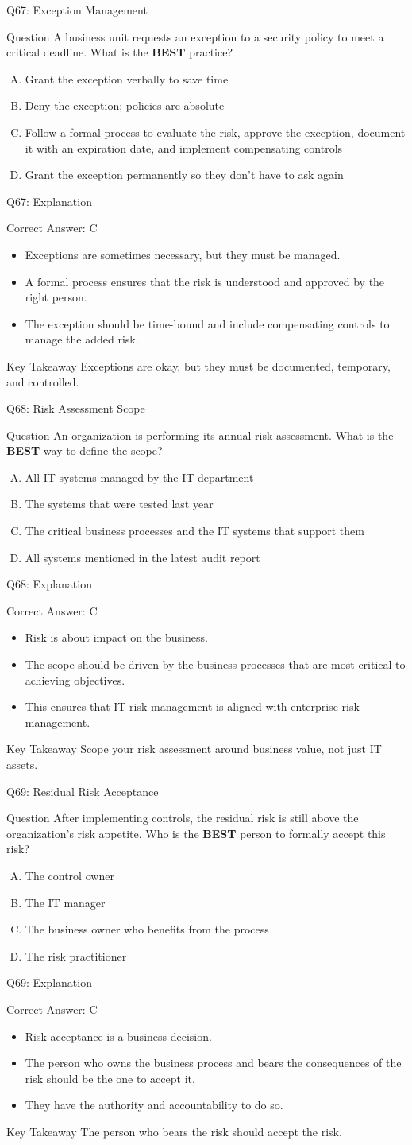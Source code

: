 \documentclass[aspectratio=169]{beamer}
\newcommand{\hq}[7]{%
	\begin{frame}{Q#1: #2}
		\begin{block}{Question}
			#3
		\end{block}
		\begin{enumerate}[(A)]
			#4
		\end{enumerate}
	\end{frame}
	\begin{frame}{Q#1: Explanation}
		\begin{block}{Correct Answer: #5}
			\begin{itemize}
				#6
			\end{itemize}
		\end{block}
		\begin{alertblock}{Key Takeaway}
			#7
		\end{alertblock}
	\end{frame}
}
\begin{document}
{		\hq{67}{Exception Management}
		{A business unit requests an exception to a security policy to meet a critical deadline. What is the \textbf{BEST} practice?}
		{\item Grant the exception verbally to save time
			\item Deny the exception; policies are absolute
			\item Follow a formal process to evaluate the risk, approve the exception, document it with an expiration date, and implement compensating controls
			\item Grant the exception permanently so they don't have to ask again}
		{C}
		{\item Exceptions are sometimes necessary, but they must be managed.
			\item A formal process ensures that the risk is understood and approved by the right person.
			\item The exception should be time-bound and include compensating controls to manage the added risk.}
		{Exceptions are okay, but they must be documented, temporary, and controlled.}
		
		\hq{68}{Risk Assessment Scope}
		{An organization is performing its annual risk assessment. What is the \textbf{BEST} way to define the scope?}
		{\item All IT systems managed by the IT department
			\item The systems that were tested last year
			\item The critical business processes and the IT systems that support them
			\item All systems mentioned in the latest audit report}
		{C}
		{\item Risk is about impact on the business.
			\item The scope should be driven by the business processes that are most critical to achieving objectives.
			\item This ensures that IT risk management is aligned with enterprise risk management.}
		{Scope your risk assessment around business value, not just IT assets.}
		
		\hq{69}{Residual Risk Acceptance}
		{After implementing controls, the residual risk is still above the organization's risk appetite. Who is the \textbf{BEST} person to formally accept this risk?}
		{\item The control owner
			\item The IT manager
			\item The business owner who benefits from the process
			\item The risk practitioner}
		{C}
		{\item Risk acceptance is a business decision.
			\item The person who owns the business process and bears the consequences of the risk should be the one to accept it.
			\item They have the authority and accountability to do so.}
		{The person who bears the risk should accept the risk.}
		
}
\end{document}
